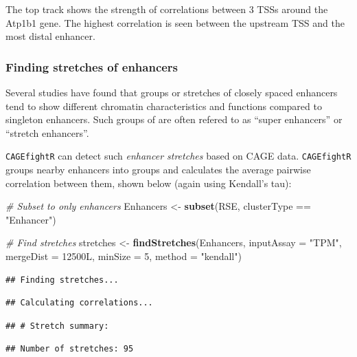 \documentclass[9pt,a4paper,]{extarticle}
\newenvironment{Shaded}{\begin{snugshade}}{\end{snugshade}}
\newcommand{\KeywordTok}[1]{\textcolor[rgb]{0.13,0.29,0.53}{\textbf{{#1}}}}
\newcommand{\DataTypeTok}[1]{\textcolor[rgb]{0.13,0.29,0.53}{{#1}}}
\newcommand{\DecValTok}[1]{\textcolor[rgb]{0.00,0.00,0.81}{{#1}}}
\newcommand{\StringTok}[1]{\textcolor[rgb]{0.31,0.60,0.02}{{#1}}}
\newcommand{\CommentTok}[1]{\textcolor[rgb]{0.56,0.35,0.01}{\textit{{#1}}}}
\newcommand{\NormalTok}[1]{{#1}}
\begin{document}
The top track shows the strength of correlations between 3 TSSs around the Atp1b1 gene. The highest correlation is seen between the upstream TSS and the most distal enhancer.

\subsubsection{Finding stretches of enhancers}\label{finding-stretches-of-enhancers}

Several studies have found that groups or stretches of closely spaced enhancers tend to show different chromatin characteristics and functions compared to singleton enhancers. Such groups of are often refered to as ``super enhancers'' or ``stretch enhancers''\citep{Pott2015}.

\texttt{CAGEfightR} can detect such \emph{enhancer stretches} based on CAGE data. \texttt{CAGEfightR} groups nearby enhancers into groups and calculates the average pairwise correlation between them, shown below (again using Kendall's tau):

\begin{Shaded}
\begin{Highlighting}[]
\CommentTok{# Subset to only enhancers}
\NormalTok{Enhancers <-}\StringTok{ }\KeywordTok{subset}\NormalTok{(RSE, clusterType ==}\StringTok{ "Enhancer"}\NormalTok{)}

\CommentTok{# Find stretches}
\NormalTok{stretches <-}\StringTok{ }\KeywordTok{findStretches}\NormalTok{(Enhancers, }
                           \DataTypeTok{inputAssay =} \StringTok{"TPM"}\NormalTok{,}
                           \DataTypeTok{mergeDist =} \NormalTok{12500L,}
                           \DataTypeTok{minSize =} \DecValTok{5}\NormalTok{,}
                           \DataTypeTok{method =} \StringTok{"kendall"}\NormalTok{)}
\end{Highlighting}
\end{Shaded}

\begin{verbatim}
## Finding stretches...
\end{verbatim}

\begin{verbatim}
## Calculating correlations...
\end{verbatim}

\begin{verbatim}
## # Stretch summary:
\end{verbatim}

\begin{verbatim}
## Number of stretches: 95
\end{verbatim}
\end{document}
